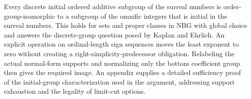 Every discrete initial ordered additive subgroup of the surreal numbers is
order-group-isomorphic to a subgroup of the omnific integers that is initial
in the surreal numbers. This holds for sets and proper classes in NBG with
global choice and answers the discrete-group question posed by Kaplan and
Ehrlich. An explicit operation on ordinal-length sign sequences moves the
least exponent to zero without creating a right-simplicity-predecessor
obligation. Relabeling the actual normal-form supports and normalizing
only the bottom coefficient group then gives the required image.
An appendix supplies a detailed sufficiency proof of the initial-group
characterization used in the argument, addressing support exhaustion and
the legality of limit-cut options.
